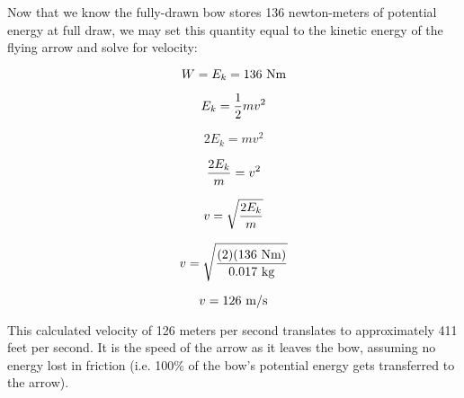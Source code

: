 \vskip 10pt

Now that we know the fully-drawn bow stores 136 newton-meters of potential energy at full draw, we may set this quantity equal to the kinetic energy of the flying arrow and solve for velocity:

$$W = E_k = 136 \hbox{ Nm}$$

$$E_k = {1 \over 2} m v^2$$

$$2 E_k = m v^2$$

$${2 E_k \over m} =v^2$$

$$v = \sqrt{ 2 E_k \over m}$$

$$v = \sqrt{ (2) (136 \hbox{ Nm}) \over 0.017 \hbox{ kg}}$$

$$v = 126 \hbox{ m/s}$$

This calculated velocity of 126 meters per second translates to approximately 411 feet per second.  It is the speed of the arrow as it leaves the bow, assuming no energy lost in friction (i.e. 100\% of the bow's potential energy gets transferred to the arrow).











